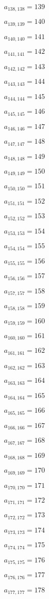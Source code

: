 \documentclass[a4paper,12pt]{article}
\begin{document}
$a _{ 138, 138 } = 139$

$a _{ 139, 139 } = 140$

$a _{ 140, 140 } = 141$

$a _{ 141, 141 } = 142$

$a _{ 142, 142 } = 143$

$a _{ 143, 143 } = 144$

$a _{ 144, 144 } = 145$

$a _{ 145, 145 } = 146$

$a _{ 146, 146 } = 147$

$a _{ 147, 147 } = 148$

$a _{ 148, 148 } = 149$

$a _{ 149, 149 } = 150$

$a _{ 150, 150 } = 151$

$a _{ 151, 151 } = 152$

$a _{ 152, 152 } = 153$

$a _{ 153, 153 } = 154$

$a _{ 154, 154 } = 155$

$a _{ 155, 155 } = 156$

$a _{ 156, 156 } = 157$

$a _{ 157, 157 } = 158$

$a _{ 158, 158 } = 159$

$a _{ 159, 159 } = 160$

$a _{ 160, 160 } = 161$

$a _{ 161, 161 } = 162$

$a _{ 162, 162 } = 163$

$a _{ 163, 163 } = 164$

$a _{ 164, 164 } = 165$

$a _{ 165, 165 } = 166$

$a _{ 166, 166 } = 167$

$a _{ 167, 167 } = 168$

$a _{ 168, 168 } = 169$

$a _{ 169, 169 } = 170$

$a _{ 170, 170 } = 171$

$a _{ 171, 171 } = 172$

$a _{ 172, 172 } = 173$

$a _{ 173, 173 } = 174$

$a _{ 174, 174 } = 175$

$a _{ 175, 175 } = 176$

$a _{ 176, 176 } = 177$

$a _{ 177, 177 } = 178$
\end{document}
